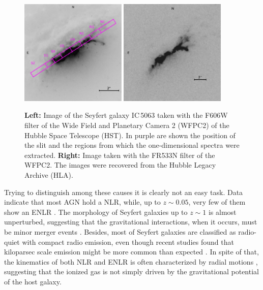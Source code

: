 \documentclass[../main.tex]{subfiles}
\begin{document}
\begin{figure}
\centering
\includegraphics[width=0.45\textwidth]{images/paper1/ic5063slit.jpg} 
\quad
\includegraphics[width=0.45\textwidth]{images/paper1/IC5063_o32.jpg} 
\caption[]{\textbf{Left:} Image of the Seyfert galaxy IC\,5063 taken with the F606W filter of the Wide Field and Planetary Camera 2 (WFPC2) of the Hubble Space Telescope (HST). In purple are shown the position of the slit and the regions from which the one-dimensional spectra were extracted. \textbf{Right:} Image taken with the FR533N filter of the WFPC2. The images were recovered from the Hubble Legacy Archive (HLA).}
\label{fig:IC5063}
\end{figure}

Trying to distinguish among these causes it is clearly not an easy task. 
Data indicate that most AGN hold a NLR, while, up to $z\sim0.05$, very few of them show an ENLR  \citep{Netzer15}. 
The morphology of Seyfert galaxies up to $z\sim1$ is almost unperturbed, suggesting that the gravitational interactions, when it occurs, must be minor merger events \citep{Cisternas11}. 
Besides, most of Seyfert galaxies are classified as radio-quiet \citep{Singh15} with compact radio emission, even though recent studies found that kiloparsec scale emission might be more common than expected \citep[e.g.][]{Gallimore06, Singh15}. 
In spite of that, the kinematics of both NLR and ENLR is often characterized by radial motions \citep[e.g.][]{Morganti07,Ozaki09,Cracco11,Netzer15}, suggesting that the ionized gas is not simply driven by the gravitational potential of the host galaxy.
\end{document}
